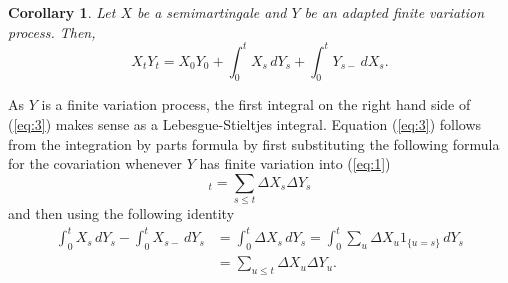 \documentclass[12pt]{article}
\newtheorem*{corollary*}{Corollary}
\begin{document}
\begin{corollary*}
Let $X$ be a semimartingale and $Y$ be an adapted finite variation process. Then,
\begin{equation}\label{eq:3}
X_tY_t = X_0Y_0 + \int_0^t X_s\,dY_s + \int_0^t Y_{s-}\,dX_s.
\end{equation}
\end{corollary*}

As $Y$ is a finite variation process, the first integral on the right hand side of (\ref{eq:3}) makes sense as a Lebesgue-Stieltjes integral.
Equation (\ref{eq:3}) follows from the integration by parts formula by first substituting the following formula for the covariation whenever $Y$ has finite variation into (\ref{eq:1})
\begin{equation*}
[X,Y]_t=\sum_{s\le t}\Delta X_s\Delta Y_s
\end{equation*}
and then using the following identity
\begin{equation*}
\begin{split}
\int_0^t X_s\,dY_s - \int_0^t X_{s-}\,dY_s
&=\int_0^t \Delta X_s\,dY_s
=\int_0^t \sum_{u}\Delta X_u 1_{\{u=s\}}\,dY_s\\
&= \sum_{u\le t}\Delta X_u\Delta Y_u.
\end{split}\end{equation*}

\end{document}
